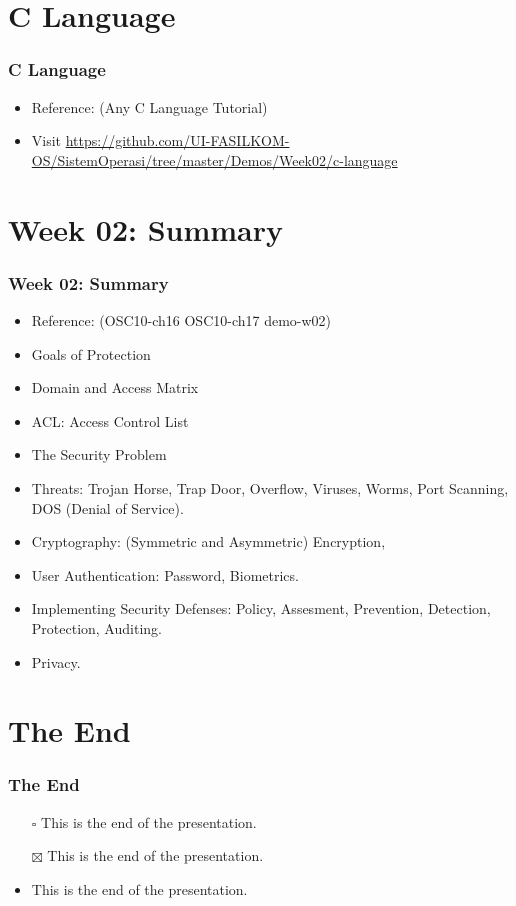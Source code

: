 \documentclass[xcolor=table, notheorems, hyperref={pdfpagelabels=false}]{beamer}
\begin{document}
\section{C Language}
\begin{frame}
\frametitle{C Language}
\begin{itemize}
\item Reference: (Any C Language Tutorial)
\item Visit
\url{https://github.com/UI-FASILKOM-OS/SistemOperasi/tree/master/Demos/Week02/c-language}
\end{itemize}
\end{frame}

\section{Week 02: Summary}
\begin{frame}
\frametitle{Week 02: Summary}
\begin{itemize}
\item Reference: (OSC10-ch16 OSC10-ch17 demo-w02)
\item Goals of Protection
\item Domain and Access Matrix
\item ACL: Access Control List
\item The Security Problem
\item Threats: Trojan Horse, Trap Door, Overflow, Viruses, Worms, Port Scanning, 
      DOS (Denial of Service).
\item Cryptography: (Symmetric and Asymmetric) Encryption,
\item User Authentication: Password, Biometrics.
\item Implementing Security Defenses: Policy, Assesment, Prevention, Detection, Protection, Auditing.
\item Privacy.
\end{itemize}
\end{frame}




\section{The End}
\begin{frame}
\frametitle{The End}
\begin{itemize}
\item[$\square$] This is the end of the presentation.
\item[$\boxtimes$] This is the end of the presentation.
\item This is the end of the presentation.
\end{itemize}
\end{frame}

\end{document}
